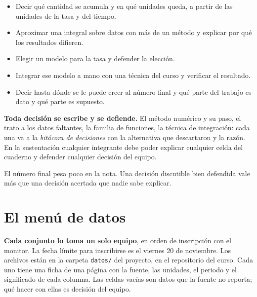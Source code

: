 \documentclass[12pt,letterpaper]{article}
\newcommand{\fechaHcero}{viernes 20 de noviembre}
\begin{document}
\begin{cajalogros}
\begin{itemize}[itemsep=0.15em]
    \item Decir qué cantidad se acumula y en qué unidades queda, a partir de las unidades de la tasa y del tiempo.
    \item Aproximar una integral sobre datos con más de un método y explicar por qué los resultados difieren.
    \item Elegir un modelo para la tasa y defender la elección.
    \item Integrar ese modelo a mano con una técnica del curso y verificar el resultado.
    \item Decir hasta dónde se le puede creer al número final y qué parte del trabajo es dato y qué parte es supuesto.
\end{itemize}
\end{cajalogros}

\begin{cajaregla}
\textbf{Toda decisión se escribe y se defiende.} El método numérico y su paso, el trato a los datos faltantes, la familia de funciones, la técnica de integración: cada una va a la \emph{bitácora de decisiones} con la alternativa que descartaron y la razón. En la sustentación cualquier integrante debe poder explicar cualquier celda del cuaderno y defender cualquier decisión del equipo.

El número final pesa poco en la nota. Una decisión discutible bien defendida vale más que una decisión acertada que nadie sabe explicar.
\end{cajaregla}

\section{El menú de datos}
\textbf{Cada conjunto lo toma un solo equipo}, en orden de inscripción con el monitor. La fecha límite para inscribirse es el \fechaHcero. Los archivos están en la carpeta \texttt{datos/} del proyecto, en el repositorio del curso. Cada uno tiene una ficha de una página con la fuente, las unidades, el periodo y el significado de cada columna. Las celdas vacías son datos que la fuente no reporta; qué hacer con ellas es decisión del equipo.
\end{document}
